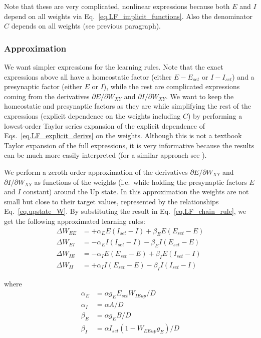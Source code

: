 \documentclass[twocolumn]{article}
\newcommand{\EE}{\mathit{EE}}
\newcommand{\EI}{\mathit{EI}}
\newcommand{\IE}{\mathit{IE}}
\newcommand{\II}{\mathit{II}}
\newcommand{\XY}{\mathit{XY}}
\newcommand{\set}{\mathit{set}}
\newcommand{\up}{\mathit{up}}
\begin{document}
\noindent Note that these are very complicated, nonlinear expressions because both $E$ and $I$ depend on all weights via Eq.\ \ref{eq.LF_implicit_functions}. Also the denominator $C$ depends on all weights (see previous paragraph).


\subsubsection{Approximation}

We want simpler expressions for the learning rules. Note that the exact expressions above all have a homeostatic factor (either $E - E_{\set}$ or $I - I_{\set}$) and a presynaptic factor (either $E$ or $I$), while the rest are complicated expressions coming from the derivatives $\partial E/\partial W_{\XY}$ and  $\partial I/\partial W_{\XY}$. We want to keep the homeostatic and presynaptic factors as they are while simplifying the rest of the expressions (explicit dependence on the weights including $C$) by performing a lowest-order Taylor series expansion of the explicit dependence of Eqs.\ \ref{eq.LF_explicit_derivs} on the weights. Although this is not a textbook Taylor expansion of the full expressions, it is very informative because the results can be much more easily interpreted (for a similar approach see \cite{Mackwood2020}).

We perform a zeroth-order approximation of the derivatives $\partial E/\partial W_{\XY}$ and  $\partial I/\partial W_{\XY}$ as functions of the weights (i.e.\ while holding the presynaptic factors $E$ and $I$ constant) around the Up state. In this approximation the weights are not small but close to their target values, represented by the relationships Eq.\ \ref{eq.upstate_W}. By substituting the result in Eq.\ \ref{eq.LF_chain_rule}, we get the following approximated learning rules:
\begin{equation}
\begin{aligned}
\Delta W_{\EE} & = + \alpha_E E(I_{\set} - I) + \beta_E E(E_{\set} - E) \\
\Delta W_{\EI} & = - \alpha_E I(I_{\set} - I) - \beta_E I(E_{\set} - E) \\
\Delta W_{\IE} & = - \alpha_I E(E_{\set} - E) + \beta_I E(I_{\set} - I) \\
\Delta W_{\II} & = + \alpha_I I(E_{\set} - E) - \beta_I I(I_{\set} - I)
\end{aligned}
\label{eq.LF_approx}
\end{equation}

\noindent where
\begin{displaymath}
\begin{aligned}
\alpha_E & = \alpha g_E E_{\set} W_{\IE\up}/D \\
\alpha_I & = \alpha A/D \\
\beta_E & = \alpha g_E B/D \\
\beta_I & = \alpha I_{\set} (1 - W_{\EE\up} g_E)/D
\end{aligned}
\end{displaymath}
\end{document}
